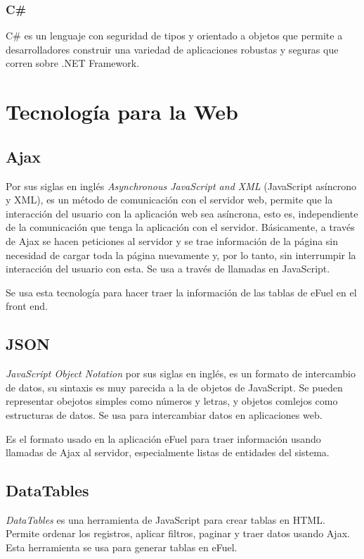 \subsubsection{C\#}
C\# \cite{cSharpMicrosoft} es un lenguaje con seguridad de tipos y orientado a objetos que permite a desarrolladores construir una variedad de aplicaciones robustas y seguras que corren sobre .NET Framework.

\section{Tecnología para la Web}
\subsection{Ajax}
Por sus siglas en inglés \emph{Asynchronous JavaScript and XML} \cite{ajaxGarrett} (JavaScript asíncrono y XML), es un método de comunicación con el servidor web, permite que la interacción del usuario con la aplicación web sea asíncrona, esto es, independiente de la comunicación que tenga la aplicación con el servidor. Básicamente, a través de Ajax se hacen peticiones al servidor y se trae información de la página sin necesidad de cargar toda la página nuevamente y, por lo tanto, sin interrumpir la interacción del usuario con esta. Se usa a través de llamadas en JavaScript.

Se usa esta tecnología para hacer traer la información de las tablas de eFuel en el front end.

\subsection{JSON}
\emph{JavaScript Object Notation} \cite{jsonMozilla} por sus siglas en inglés, es un formato de intercambio de datos, su sintaxis es muy parecida a la de objetos de JavaScript. Se pueden representar obejotos simples como números y letras, y objetos comlejos como estructuras de datos. Se usa para intercambiar datos en aplicaciones web.

Es el formato usado en la aplicación eFuel para traer información usando llamadas de Ajax al servidor, especialmente listas de entidades del sistema.

\subsection{DataTables}
\emph{DataTables} \cite{datatablesManual} es una herramienta de JavaScript para crear tablas en HTML. Permite ordenar los registros, aplicar filtros, paginar y traer datos usando Ajax. Esta herramienta se usa para generar tablas en eFuel.

